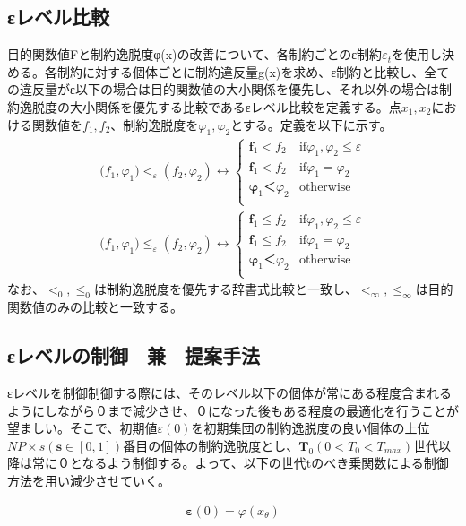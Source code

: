 \documentclass[twocolumn,10pt]{jarticle}
\begin{document}
\subsection{εレベル比較}
目的関数値Fと制約逸脱度φ(x)の改善について、各制約ごとのε制約${ε}_t$を使用し決める。各制約に対する個体ごとに制約違反量g(x)を求め、ε制約と比較し、全ての違反量がε以下の場合は目的関数値の大小関係を優先し、それ以外の場合は制約逸脱度の大小関係を優先する比較であるεレベル比較を定義する。点${x}_1,{x}_2$における関数値を${f}_1,{f}_2$、制約逸脱度を${φ}_1,{φ}_2$とする。定義を以下に示す。
\begin{eqnarray}
\bm({f}_1,{φ}_1){<}_ε({f}_2,{φ}_2)
\leftrightarrow
\left\{
\begin{array}{cc}
    \bm{f}_1<{f}_2 & \mbox{if${φ}_1,{φ}_2 \leq ε$}\\
    \bm{f}_1<{f}_2 & \mbox{if${φ}_1={φ}_2$}\\
    \bm{φ}_1＜{φ}_2 & \mbox{otherwise}\\
\end{array}
\right.
\end{eqnarray}
\begin{eqnarray}
\bm({f}_1,{φ}_1){\leq}_ε({f}_2,{φ}_2)
\leftrightarrow
\left\{
\begin{array}{cc}
    \bm{f}_1\leq{f}_2 & \mbox{if${φ}_1,{φ}_2 \leq ε$}\\
    \bm{f}_1\leq{f}_2 & \mbox{if${φ}_1={φ}_2$}\\
    \bm{φ}_1＜{φ}_2 & \mbox{otherwise}\\
\end{array}
\right.
\end{eqnarray}
なお、${<}_0,{\leq}_0$は制約逸脱度を優先する辞書式比較と一致し、${<}_∞,{\leq}_∞$は目的関数値のみの比較と一致する。

\subsection{εレベルの制御　兼　提案手法}
εレベルを制御制御する際には、そのレベル以下の個体が常にある程度含まれるようにしながら０まで減少させ、０になった後もある程度の最適化を行うことが望ましい。そこで、初期値$ε(0)$を初期集団の制約逸脱度の良い個体の上位${NP}×s(\bm{s}\in[0,1])$番目の個体の制約逸脱度とし、$\bm{T}_0(0<{T}_0<{T}_{max})$世代以降は常に０となるよう制御する。よって、以下の世代tのべき乗関数による制御方法を用い減少させていく。

\begin{eqnarray}
\bm{ε}(0)=φ({x}_θ)
\end{eqnarray}
\end{document}
